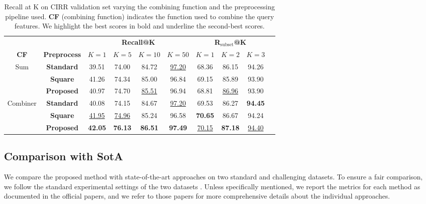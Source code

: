 \documentclass[acmlarge]{acmart}
\begin{document}
\begin{table}[tb]
\centering
\begin{tabular}{ccc  cccc ccc}
  \toprule
&& \multicolumn{4}{c}{\textbf{Recall@K}} & \multicolumn{3}{c}{\textbf{R$_\text{subset}$@K}} \\
\cmidrule(lr){3-6}
\cmidrule(lr){7-9}
\textbf{CF} & \textbf{Preprocess}  & $K=1$ & $K=5$ &  $K=10$ & $K=50$ &  $K=1$ & $K=2$ &  $K=3$ \\
\midrule
\multirow{3}{*}{Sum} & \textbf{Standard} & 39.51 & 74.00 & 84.72 & \underline{97.20} & 68.36 & 86.15 & 94.26 \\ &\textbf{Square} & 41.26 & 74.34 & 85.00 & 96.84 & 69.15 & 85.89 & 93.90 \\ &\textbf{Proposed}  & 40.97 & 74.70 & \underline{85.51} & 96.94 & 68.81 & \underline{86.96} & 93.90 \\ \midrule[.02em]
\multirow{3}{*}{Combiner} & \textbf{Standard} &  40.08 & 74.15 & 84.67 & \underline{97.20} & 69.53 & 86.27 & \textbf{94.45} \\ &\textbf{Square} & \underline{41.95} & \underline{74.96} & 85.24 & 96.58 & \textbf{70.65} & 86.67 & 94.24 \\ & \textbf{Proposed} & \textbf{42.05} & \textbf{76.13} & \textbf{86.51} & \textbf{97.49} & \underline{70.15} & \textbf{87.18} & \underline{94.40} \\ \bottomrule
\end{tabular}
\caption{Recall at K on CIRR validation set varying the combining function and the preprocessing pipeline used. \textbf{CF} (combining function) indicates the function used to combine the query features. We highlight the best scores in bold and underline the second-best scores.}
\label{tab:cirr-preprocess}
\vspace{-4ex}
\end{table}

\subsection{Comparison with SotA}
We compare the proposed method with state-of-the-art approaches on two standard and challenging datasets.
To ensure a fair comparison, we follow the standard experimental settings of the two datasets \cite{wu2021fashion, liu2021image}. 
Unless specifically mentioned, we report the metrics for each method as documented in the official papers, and we refer to those papers for more comprehensive details about the individual approaches.
\end{document}
